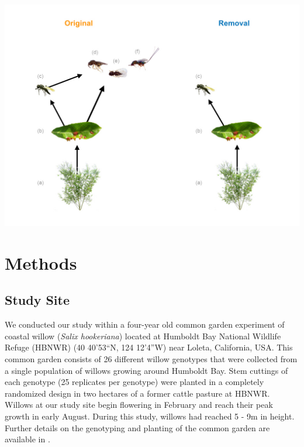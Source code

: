 \documentclass[11pt,]{article}
\let\origfigure\figure
\let\endorigfigure\endfigure
\renewenvironment{figure}[1][2] {
    \expandafter\origfigure\expandafter[H]
} {
    \endorigfigure
}
\begin{document}
\begin{figure}
\centering
\includegraphics{../analyses/complex_simple_foodwebs_v4_5.jpg}
\caption{\label{fig:Conceptual}Experimental manipulation of food-web
structure associated with a leaf-galling midge (b, \emph{Iteomyia
salicisverruca}) feeding on the willow \emph{Salix hookeriana} (a).
Black arrows denote the flow of energy in this network of trophic
interactions. In the original food web, we allowed the full suite of egg
and larval parasitoids to impose selection. In the removal food web, we
used mesh bags to exclude the guild of larval parasitoids, only allowing
the egg parasitoid (c, \emph{Platygaster} sp.) to impose selection. Note
that larval parasitoids also impose indirect effects on gall midge
fitness through intraguild predation on the egg parasitoid. Larval
parasitoids include the following species: \emph{Mesopolobus} sp. (d,
Family: Pteromalidae); \emph{Tetrastichus} sp. (e, Family: Eulophidae);
and \emph{Torymus} sp. (f, Family: Torymidae).}
\end{figure}

\section{Methods}\label{methods}

\subsection{Study Site}\label{study-site}

We conducted our study within a four-year old common garden experiment
of coastal willow (\emph{Salix hookeriana}) located at Humboldt Bay
National Wildlife Refuge (HBNWR) (40 40'53``N, 124 12'4''W) near Loleta,
California, USA. This common garden consists of 26 different willow
genotypes that were collected from a single population of willows
growing around Humboldt Bay. Stem cuttings of each genotype (25
replicates per genotype) were planted in a completely randomized design
in two hectares of a former cattle pasture at HBNWR. Willows at our
study site begin flowering in February and reach their peak growth in
early August. During this study, willows had reached 5 - 9m in height.
Further details on the genotyping and planting of the common garden are
available in \citet{Barbour2015}.
\end{document}
